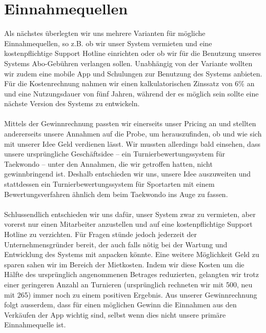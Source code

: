\section{Einnahmequellen}
Als nächstes überlegten wir uns mehrere Varianten für mögliche Einnahmequellen, so z.B. ob wir unser System vermieten und
    eine kostenpflichtige Support Hotline einrichten oder ob wir für die Benutzung unseres Systems
    Abo-Gebühren verlangen sollen.
Unabhängig von der Variante wollten wir zudem eine mobile App und Schulungen zur Benutzung des Systems anbieten.
Für die Kostenrechnung nahmen wir einen kalkulatorischen Zinssatz von 6\% an und eine Nutzungsdauer von fünf Jahren,
während der es möglich sein sollte eine nächste Version des Systems zu entwickeln.
\\\\
Mittels der Gewinnrechnung passten wir einerseits unser Pricing an und stellten andererseits unsere Annahmen auf die Probe,
um herauszufinden, ob und wie sich mit unserer Idee Geld verdienen lässt.
Wir mussten allerdings bald einsehen, dass unsere ursprüngliche Geschäftsidee – ein Turnierbewertungssystem für
Taekwondo – unter den Annahmen, die wir getroffen hatten, nicht gewinnbringend ist.
Deshalb entschieden wir uns, unsere Idee auszuweiten und stattdessen ein Turnierbewertungssystem für Sportarten mit einem
Bewertungsverfahren ähnlich dem beim Taekwondo ins Auge zu fassen.
\\\\
Schlussendlich entschieden wir uns dafür, unser System zwar zu vermieten, aber vorerst nur einen Mitarbeiter anzustellen
und auf eine kostenpflichtige Support Hotline zu verzichten.
Für Fragen stünde jedoch jederzeit der Unternehmensgründer bereit, der auch falls nötig bei der Wartung und Entwicklung
des Systems mit anpacken könnte.
Eine weitere Möglichkeit Geld zu sparen sahen wir im Bereich der Mietkosten.
Indem wir diese Kosten um die Hälfte des ursprünglich angenommenen Betrages reduzierten, gelangten wir trotz einer
geringeren Anzahl an Turnieren (ursprünglich rechneten wir mit 500, neu mit 265) immer noch zu einem positiven Ergebnis.
Aus unserer Gewinnrechnung folgt ausserdem, dass für einen möglichen Gewinn die Einnahmen aus den Verkäufen der App wichtig sind,
selbst wenn dies nicht unsere primäre Einnahmequelle ist.



